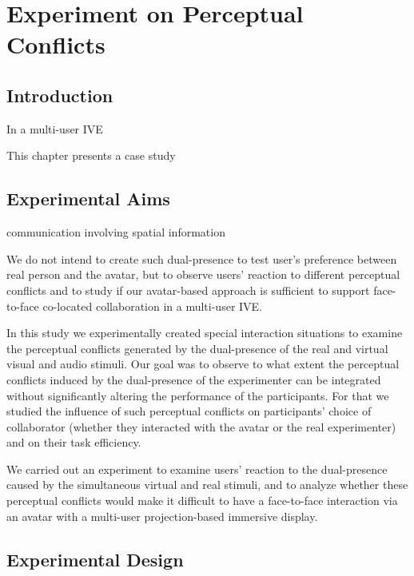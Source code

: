 \chapter{Experiment on Perceptual Conflicts}
\label{chapter:expe_perception}
\minitoc

\section{Introduction}

In a multi-user IVE

This chapter presents a case study

\section{Experimental Aims}
communication involving spatial information

We do not intend to create such dual-presence to test user's preference between real person and the avatar, but to observe users' reaction to different perceptual conflicts and to study if our avatar-based approach is sufficient to support face-to-face co-located collaboration in a multi-user IVE.

In this study we experimentally created special interaction situations to examine the perceptual conflicts generated by the dual-presence of the real and virtual visual and audio stimuli. Our goal was to observe to what extent the perceptual conflicts induced by the dual-presence of the experimenter can be integrated without significantly altering the performance of the participants. For that we studied the influence of such perceptual conflicts on participants' choice of collaborator (whether they interacted with the avatar or the real experimenter) and on their task efficiency.

We carried out an experiment to examine users' reaction to the dual-presence caused by the simultaneous virtual and real stimuli, and to analyze whether these perceptual conflicts would make it difficult to have a face-to-face interaction via an avatar with a multi-user projection-based immersive display.






\section{Experimental Design}

